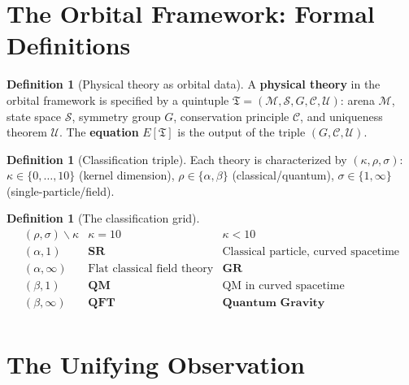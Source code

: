 \documentclass[12pt]{article}
\theoremstyle{plain}
\theoremstyle{definition}
\newtheorem{definition}[theorem]{Definition}
\theoremstyle{remark}
\begin{document}
\section{The Orbital Framework: Formal Definitions}
\label{sec:framework}

\begin{definition}[Physical theory as orbital data]\label{def:theory}
A \textbf{physical theory} in the orbital framework is specified by a quintuple $\mathfrak{T} = (\mathcal{M}, \mathcal{S}, G, \mathcal{C}, \mathcal{U})$: arena $\mathcal{M}$, state space $\mathcal{S}$, symmetry group $G$, conservation principle $\mathcal{C}$, and uniqueness theorem $\mathcal{U}$. The \textbf{equation} $E[\mathfrak{T}]$ is the output of the triple $(G, \mathcal{C}, \mathcal{U})$.
\end{definition}

\begin{definition}[Classification triple]\label{def:triple}
Each theory is characterized by $(\kappa, \rho, \sigma)$: $\kappa \in \{0, \ldots, 10\}$ (kernel dimension), $\rho \in \{\alpha, \beta\}$ (classical/quantum), $\sigma \in \{1, \infty\}$ (single-particle/field).
\end{definition}

\begin{definition}[The classification grid]\label{def:grid}
\begin{equation}\label{eq:grid}
\begin{array}{c|cc}
(\rho, \sigma) \backslash \kappa & \kappa = 10 & \kappa < 10 \\[3pt] \hline
(\alpha, 1) & \textbf{SR} & \text{Classical particle, curved spacetime} \\[3pt]
(\alpha, \infty) & \text{Flat classical field theory} & \textbf{GR} \\[3pt]
(\beta, 1) & \textbf{QM} & \text{QM in curved spacetime} \\[3pt]
(\beta, \infty) & \textbf{QFT} & \textbf{Quantum Gravity} \\[3pt]
\end{array}
\end{equation}
\end{definition}


\section{The Unifying Observation}
\label{sec:meta}
\end{document}
